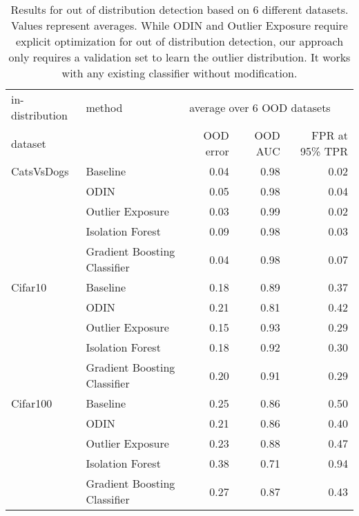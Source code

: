 \documentclass{article}
\begin{document}
\begin{table}
\centering
\caption{Results for out of distribution detection based on 6 different datasets. Values represent averages. While ODIN and Outlier Exposure require explicit optimization for out of distribution detection, our approach only requires a validation set to learn the outlier distribution. It works with any existing classifier without modification.}
\label{aggOODResult}
\begin{tabular}{llrrr}
\toprule
in-distribution        &   method                           & \multicolumn{3}{l}{average over 6 OOD datasets} \\
dataset        &                              &                   OOD error & OOD AUC & FPR at 95\% TPR \\
\midrule
CatsVsDogs & Baseline &                        0.04 &    0.98 &           0.02 \\
        & ODIN &                        0.05 &    0.98 &           0.04 \\
        & Outlier Exposure &                        0.03 &    0.99 &           0.02 \\
        & Isolation Forest &                        0.09 &    0.98 &           0.03 \\
        & Gradient Boosting Classifier &                        0.04 &    0.98 &           0.07 \\
Cifar10 & Baseline &                        0.18 &    0.89 &           0.37 \\
        & ODIN &                        0.21 &    0.81 &           0.42 \\
        & Outlier Exposure &                        0.15 &    0.93 &           0.29 \\
        & Isolation Forest &                        0.18 &    0.92 &           0.30 \\
        & Gradient Boosting Classifier &                        0.20 &    0.91 &           0.29 \\
Cifar100 & Baseline &                        0.25 &    0.86 &           0.50 \\
        & ODIN &                        0.21 &    0.86 &           0.40 \\
        & Outlier Exposure &                        0.23 &    0.88 &           0.47 \\
        & Isolation Forest &                        0.38 &    0.71 &           0.94 \\
        & Gradient Boosting Classifier &                        0.27 &    0.87 &           0.43 \\

\end{tabular}
\end{table}
\end{document}
